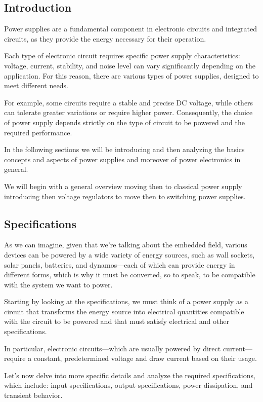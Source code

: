 \documentclass[../main.tex]{subfiles}
\begin{document}
\subsection{Introduction}

Power supplies are a fundamental component in electronic circuits and integrated circuits, as they provide the energy necessary for their operation.

Each type of electronic circuit requires specific power supply characteristics: voltage, current, stability, and noise level can vary significantly depending on the application. For this reason, there are various types of power supplies, designed to meet different needs.

For example, some circuits require a stable and precise DC voltage, while others can tolerate greater variations or require higher power. Consequently, the choice of power supply depends strictly on the type of circuit to be powered and the required performance. 

In the following sections we will be introducing and then analyzing the basics concepts and aspects of power supplies and moreover of power electronics in general.

We will begin with a general overview moving then to classical power supply introducing then voltage regulators to move then to switching power supplies.

\subsection{Specifications}

As we can imagine, given that we’re talking about the embedded field, various devices can be powered by a wide variety of energy sources, such as wall sockets, solar panels, batteries, and dynamos—each of which can provide energy in different forms, which is why it must be converted, so to speak, to be compatible with the system we want to power.  

Starting by looking at the specifications, we must think of a power supply as a circuit that transforms the energy source into electrical quantities compatible with the circuit to be powered and that must satisfy electrical and other specifications.

In particular, electronic circuits—which are usually powered by direct current—require a constant, predetermined voltage and draw current based on their usage. 

Let’s now delve into more specific details and analyze the required specifications, which include: input specifications, output specifications, power dissipation, and transient behavior.
\end{document}
